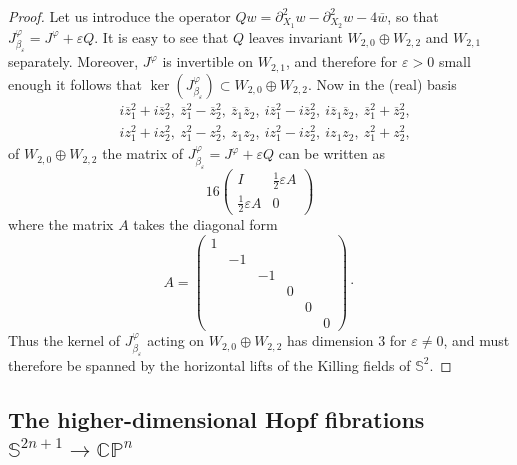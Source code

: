 \documentclass{article}
\numberwithin{equation}{section}        %
\theoremstyle{bfnote}
\theoremstyle{definition}
\theoremstyle{bfremark}
\newcommand{\C}{\mathbb{C}}                 %
\newcommand{\Sp}{\mathbb{S}}                %
\begin{document}
\begin{proof}
    Let us introduce the operator $Q w = \partial_{X_1}^2w -\partial_{X_2}^2w - 4 \overline{w}$, so that $J^\varphi_{\beta_\varepsilon} = J^\varphi + \varepsilon Q$. It is easy to see that $Q$ leaves invariant $W_{2,0} \oplus W_{2,2}$ and $W_{2,1}$ separately. Moreover, $J^\varphi$ is invertible on $W_{2,1}$, and therefore for $\varepsilon >0$ small enough it follows that $\ker(J^\varphi_{\beta_\varepsilon}) \subset W_{2,0} \oplus W_{2,2}$. Now in the (real) basis
    \begin{align*}
        &i \overline z_1^2 + i \overline z_2^2, ~ \overline z_1^2-\overline{z}_2^2, ~ \overline z_1 \overline z_2, ~ i\overline{z}_1^2-i\overline{z}_2^2, ~ i \overline z_1 \overline z_2, ~ \overline{z}_1^2 + \overline{z}_2^2, \\
        & iz_1^2+iz_2^2, ~ z_1^2- z_2^2, ~ z_1z_2, ~ iz_1^2-iz_2^2, ~ iz_1z_2, ~ z_1^2 + z_2^2,
    \end{align*}
    of $W_{2,0} \oplus W_{2,2}$ the matrix of $J^\varphi_{\beta_\varepsilon} = J^\varphi + \varepsilon Q$ can be written as
    \begin{equation*}
        16\begin{pmatrix}
             I &  \frac{1}{2}\varepsilon A \\ \frac{1}{2}\varepsilon  A & 0
        \end{pmatrix}
    \end{equation*}
    where the matrix $A$ takes the diagonal form
    \begin{equation*}
        A = \begin{pmatrix}
            1 & \\
            & -1 & \\
            & & -1 \\
            & & & 0 \\
            & & & & 0  \\
            & & & & & 0
        \end{pmatrix} \cdot
    \end{equation*}
    Thus the kernel of $J^\varphi_{\beta_\varepsilon}$ acting on $W_{2,0} \oplus W_{2,2}$ has dimension $3$ for $\varepsilon \neq 0$, and must therefore be spanned by the horizontal lifts of the Killing fields of $\Sp^2$.
\end{proof}


    \subsection{The higher-dimensional Hopf fibrations $\Sp^{2n+1} \to \C\mathbb{P}^n$}     \label{subsec: higher Hopf fibrations}
\end{document}
